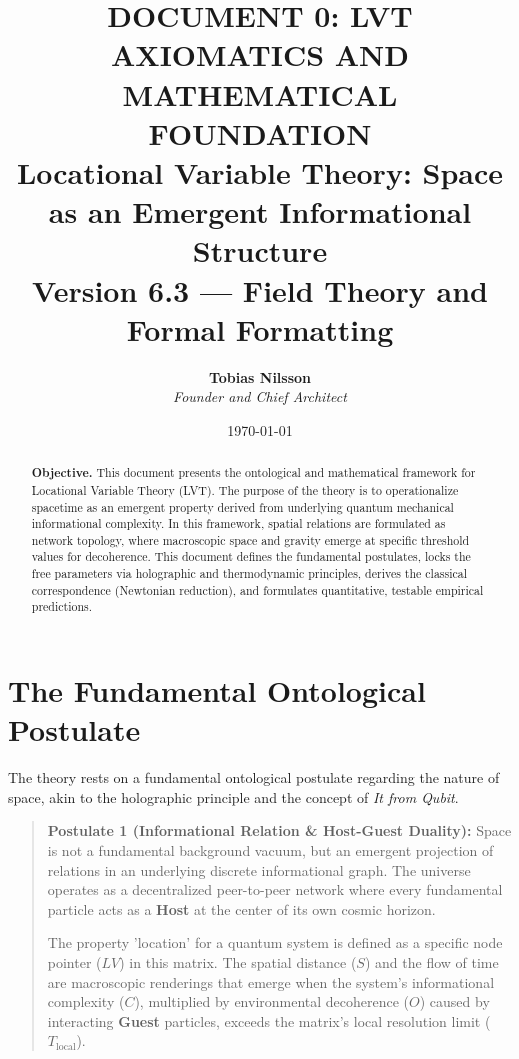 \documentclass[12pt,a4paper]{article}
\title{\Huge
\textbf{DOCUMENT 0: LVT AXIOMATICS AND MATHEMATICAL FOUNDATION} \\
\large Locational Variable Theory: Space as an Emergent Informational Structure \\[0.5em]
\normalsize Version 6.3 --- Field Theory and Formal Formatting}
\author{\textbf{Tobias Nilsson} \\
\textit{Founder and Chief Architect}}
\date{\today}
\begin{document}
\maketitle

\vspace{-1em}
\begin{abstract}
\noindent
\textbf{Objective.} 
This document presents the ontological and mathematical framework for Locational Variable Theory (LVT). The purpose of the theory is to operationalize spacetime as an emergent property derived from underlying quantum mechanical informational complexity. In this framework, spatial relations are formulated as network topology, where macroscopic space and gravity emerge at specific threshold values for decoherence. This document defines the fundamental postulates, locks the free parameters via holographic and thermodynamic principles, derives the classical correspondence (Newtonian reduction), and formulates quantitative, testable empirical predictions.
\end{abstract}

\section{The Fundamental Ontological Postulate}

The theory rests on a fundamental ontological postulate regarding the nature of space, akin to the holographic principle and the concept of \textit{It from Qubit}.

\begin{quote}
\textbf{Postulate 1 (Informational Relation \& Host-Guest Duality):} Space is not a fundamental background vacuum, but an emergent projection of relations in an underlying discrete informational graph. The universe operates as a decentralized peer-to-peer network where every fundamental particle acts as a \textbf{Host} at the center of its own cosmic horizon. 

The property 'location' for a quantum system is defined as a specific node pointer ($LV$) in this matrix. The spatial distance ($S$) and the flow of time are macroscopic renderings that emerge when the system's informational complexity ($C$), multiplied by environmental decoherence ($O$) caused by interacting \textbf{Guest} particles, exceeds the matrix's local resolution limit ($T_{\mathrm{local}}$).
\end{quote}
\end{document}
